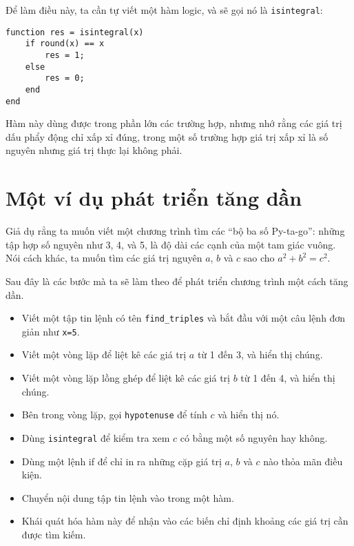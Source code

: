 \documentclass[12pt]{book}
\begin{document}
Để làm điều này, ta cần tự viết một hàm logic, và sẽ gọi nó
là {\tt isintegral}:

\begin{verbatim}
function res = isintegral(x)
    if round(x) == x
        res = 1;
    else
        res = 0;
    end
end
\end{verbatim}

Hàm này dùng được trong phần lớn các trường hợp, nhưng nhớ rằng
các giá trị dấu phẩy động chỉ xấp xỉ đúng, trong một số trường hợp
giá trị xấp xỉ là số nguyên nhưng giá trị thực lại không phải.


\section{Một ví dụ phát triển tăng dần}
\label{increxample}

Giả dụ rẳng ta muốn viết một chương trình tìm các ``bộ ba số
Py-ta-go'': những tập hợp số nguyên như 3, 4, và 5, là độ dài
các cạnh của một tam giác vuông. Nói cách khác, ta muốn tìm các
giá trị nguyên $a$, $b$ và $c$ sao cho $a^2 + b^2 = c^2$.

Sau đây là các bước mà ta sẽ làm theo để phát triển chương trình
một cách tăng dần.

\begin{itemize}

\item Viết một tập tin lệnh có tên \verb#find_triples# và bắt đầu
với một câu lệnh đơn giản như {\tt x=5}.

\item Viết một vòng lặp để liệt kê các giá trị $a$ từ 1 đến 3, và
hiển thị chúng.

\item Viết một vòng lặp lồng ghép để liệt kê các giá trị $b$ từ 1 đến 4,
và hiển thị chúng.

\item Bên trong vòng lặp, gọi {\tt hypotenuse} để tính $c$ và
hiển thị nó.

\item Dùng {\tt isintegral} để kiểm tra xem $c$ có bằng một số nguyên
hay không.

\item Dùng một lệnh if để chỉ in ra những cặp giá trị $a$, $b$ và $c$
nào thỏa mãn điều kiện.

\item Chuyển nội dung tập tin lệnh vào trong một hàm.

\item Khái quát hóa hàm này để nhận vào các biến chỉ định khoảng các
giá trị cần được tìm kiếm.

\end{itemize}
\end{document}
